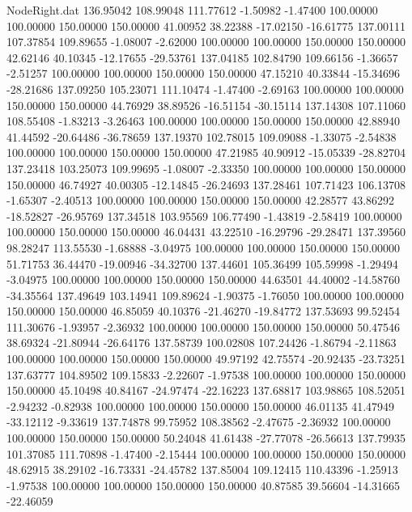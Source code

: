 \begin{filecontents}{NodeRight.dat}
 136.95042  108.99048  111.77612    -1.50982   -1.47400  100.00000  100.00000  150.00000  150.00000   41.00952   38.22388  -17.02150  -16.61775
 137.00111  107.37854  109.89655    -1.08007   -2.62000  100.00000  100.00000  150.00000  150.00000   42.62146   40.10345  -12.17655  -29.53761
 137.04185  102.84790  109.66156    -1.36657   -2.51257  100.00000  100.00000  150.00000  150.00000   47.15210   40.33844  -15.34696  -28.21686
 137.09250  105.23071  111.10474    -1.47400   -2.69163  100.00000  100.00000  150.00000  150.00000   44.76929   38.89526  -16.51154  -30.15114
 137.14308  107.11060  108.55408    -1.83213   -3.26463  100.00000  100.00000  150.00000  150.00000   42.88940   41.44592  -20.64486  -36.78659
 137.19370  102.78015  109.09088    -1.33075   -2.54838  100.00000  100.00000  150.00000  150.00000   47.21985   40.90912  -15.05339  -28.82704
 137.23418  103.25073  109.99695    -1.08007   -2.33350  100.00000  100.00000  150.00000  150.00000   46.74927   40.00305  -12.14845  -26.24693
 137.28461  107.71423  106.13708    -1.65307   -2.40513  100.00000  100.00000  150.00000  150.00000   42.28577   43.86292  -18.52827  -26.95769
 137.34518  103.95569  106.77490    -1.43819   -2.58419  100.00000  100.00000  150.00000  150.00000   46.04431   43.22510  -16.29796  -29.28471
 137.39560   98.28247  113.55530    -1.68888   -3.04975  100.00000  100.00000  150.00000  150.00000   51.71753   36.44470  -19.00946  -34.32700
 137.44601  105.36499  105.59998    -1.29494   -3.04975  100.00000  100.00000  150.00000  150.00000   44.63501   44.40002  -14.58760  -34.35564
 137.49649  103.14941  109.89624    -1.90375   -1.76050  100.00000  100.00000  150.00000  150.00000   46.85059   40.10376  -21.46270  -19.84772
 137.53693   99.52454  111.30676    -1.93957   -2.36932  100.00000  100.00000  150.00000  150.00000   50.47546   38.69324  -21.80944  -26.64176
 137.58739  100.02808  107.24426    -1.86794   -2.11863  100.00000  100.00000  150.00000  150.00000   49.97192   42.75574  -20.92435  -23.73251
 137.63777  104.89502  109.15833    -2.22607   -1.97538  100.00000  100.00000  150.00000  150.00000   45.10498   40.84167  -24.97474  -22.16223
 137.68817  103.98865  108.52051    -2.94232   -0.82938  100.00000  100.00000  150.00000  150.00000   46.01135   41.47949  -33.12112   -9.33619
 137.74878   99.75952  108.38562    -2.47675   -2.36932  100.00000  100.00000  150.00000  150.00000   50.24048   41.61438  -27.77078  -26.56613
 137.79935  101.37085  111.70898    -1.47400   -2.15444  100.00000  100.00000  150.00000  150.00000   48.62915   38.29102  -16.73331  -24.45782
 137.85004  109.12415  110.43396    -1.25913   -1.97538  100.00000  100.00000  150.00000  150.00000   40.87585   39.56604  -14.31665  -22.46059

\end{filecontents}

